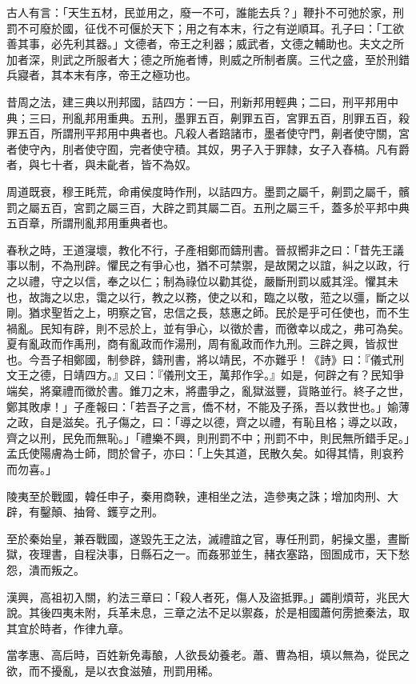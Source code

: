 \begin{pinyinscope}
古人有言：「天生五材，民並用之，廢一不可，誰能去兵？」鞭扑不可弛於家，刑罰不可廢於國，征伐不可偃於天下；用之有本末，行之有逆順耳。孔子曰：「工欲善其事，必先利其器。」文德者，帝王之利器；威武者，文德之輔助也。夫文之所加者深，則武之所服者大；德之所施者博，則威之所制者廣。三代之盛，至於刑錯兵寢者，其本末有序，帝王之極功也。

昔周之法，建三典以刑邦國，詰四方：一曰，刑新邦用輕典；二曰，刑平邦用中典；三曰，刑亂邦用重典。五刑，墨罪五百，劓罪五百，宮罪五百，刖罪五百，殺罪五百，所謂刑平邦用中典者也。凡殺人者踣諸市，墨者使守門，劓者使守關，宮者使守內，刖者使守囿，完者使守積。其奴，男子入于罪隸，女子入舂槁。凡有爵者，與七十者，與未齔者，皆不為奴。

周道既衰，穆王眊荒，命甫侯度時作刑，以詰四方。墨罰之屬千，劓罰之屬千，髕罰之屬五百，宮罰之屬三百，大辟之罰其屬二百。五刑之屬三千，蓋多於平邦中典五百章，所謂刑亂邦用重典者也。

春秋之時，王道寖壞，教化不行，子產相鄭而鑄刑書。晉叔嚮非之曰：「昔先王議事以制，不為刑辟。懼民之有爭心也，猶不可禁禦，是故閑之以誼，糾之以政，行之以禮，守之以信，奉之以仁；制為祿位以勸其從，嚴斷刑罰以威其淫。懼其未也，故誨之以忠，霭之以行，教之以務，使之以和，臨之以敬，蒞之以彊，斷之以剛。猶求聖哲之上，明察之官，忠信之長，慈惠之師。民於是乎可任使也，而不生禍亂。民知有辟，則不忌於上，並有爭心，以徵於書，而徼幸以成之，弗可為矣。夏有亂政而作禹刑，商有亂政而作湯刑，周有亂政而作九刑。三辟之興，皆叔世也。今吾子相鄭國，制參辟，鑄刑書，將以靖民，不亦難乎！《詩》曰：『儀式刑文王之德，日靖四方。』又曰：『儀刑文王，萬邦作孚。』如是，何辟之有？民知爭端矣，將棄禮而徵於書。錐刀之末，將盡爭之，亂獄滋豐，貨賂並行。終子之世，鄭其敗虖！」子產報曰：「若吾子之言，僑不材，不能及子孫，吾以救世也。」媮薄之政，自是滋矣。孔子傷之，曰：「導之以德，齊之以禮，有恥且格；導之以政，齊之以刑，民免而無恥。」「禮樂不興，則刑罰不中；刑罰不中，則民無所錯手足。」孟氏使陽膚為士師，問於曾子，亦曰：「上失其道，民散久矣。如得其情，則哀矜而勿喜。」

陵夷至於戰國，韓任申子，秦用商鞅，連相坐之法，造參夷之誅；增加肉刑、大辟，有鑿顛、抽脅、鑊亨之刑。

至於秦始皇，兼吞戰國，遂毀先王之法，滅禮誼之官，專任刑罰，躬操文墨，晝斷獄，夜理書，自程決事，日縣石之一。而姦邪並生，赭衣塞路，囹圄成市，天下愁怨，潰而叛之。

漢興，高祖初入關，約法三章曰：「殺人者死，傷人及盜抵罪。」蠲削煩苛，兆民大說。其後四夷未附，兵革未息，三章之法不足以禦姦，於是相國蕭何雳摭秦法，取其宜於時者，作律九章。

當孝惠、高后時，百姓新免毒酿，人欲長幼養老。蕭、曹為相，填以無為，從民之欲，而不擾亂，是以衣食滋殖，刑罰用稀。


\end{pinyinscope}
